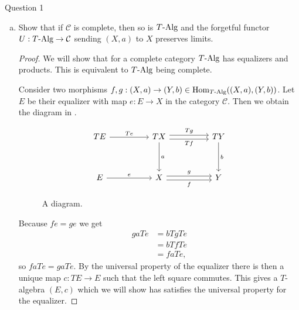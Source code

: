 \documentclass{article}
\DeclareMathOperator{\Id}{Id}
\DeclareMathOperator{\Hom}{Hom}
\newcommand{\cat}{\mathcal{C}}
\newcommand{\alg}[1]{T\textnormal{-Alg}}
\newenvironment{question}[1][]{\begin{paragraph}{Question #1}}{\end{paragraph}}
\theoremstyle{definition}
\begin{document}
\begin{question}[1]
\begin{enumerate}[(a)]
\begin{proof}
                  We know \(fa=\Id\) so \(Taf=T\Id=\Id\). By commutativity of
                  the left square of  this means
                  \(af=\Id\). Therefore \(f\) is a left and right inverse of
                  \(a\) so \(a\) is an isomorphism.
              \end{proof}

        \item Show that if \(\cat\) is complete, then so is \(\alg{T}\) and the
              forgetful functor \(U:\alg{T}\to\cat\) sending \((X,a)\) to \(X\)
              preserves limits.

              \begin{proof}
                  We will show that for a complete category \(\alg{T}\) has
                  equalizers and products. This is equivalent to \(\alg{T}\)
                  being complete.

                  Consider two morphisms \(f,g:(X,a)\to
                  (Y,b)\in\Hom_{\alg{T}}((X,a),(Y,b))\). Let \(E\) be their
                  equalizer with map \(e:E\to X\) in the category \(\cat\).
                  Then we obtain the diagram in .
                  \begin{figure}[H]
                      \[
                          \begin{tikzcd}[ampersand replacement=\&]
                              TE \&\& TX \&\& TY \\
                              \\
                              E \&\& X \&\& Y
                              \arrow["f"', shift right=1, from=3-3, to=3-5]
                              \arrow["g", shift left=1, from=3-3, to=3-5]
                              \arrow["a", from=1-3, to=3-3]
                              \arrow["b", from=1-5, to=3-5]
                              \arrow["Tf"', shift right=1, from=1-3, to=1-5]
                              \arrow["Tg", shift left=1, from=1-3, to=1-5]
                              \arrow["e", from=3-1, to=3-3]
                              \arrow["Te", from=1-1, to=1-3]
                          \end{tikzcd}
                      \]
                      \caption{A diagram.}
                      \label{fig:dia-1}
                  \end{figure}
                  Because \(fe=ge\) we get
                  \begin{align*}
                      gaTe & =bTgTe \\
                           & =bTfTe \\
                           & =faTe,
                  \end{align*}
                  so \(faTe=gaTe\). By the universal property of the equalizer
                  there is then a unique map \(c:TE\to E\) such that the left
                  square commutes. This gives a \(T\)-algebra \((E,c)\) which we
                  will show has satisfies the universal property for the
                  equalizer.


\end{proof}
\end{enumerate}
\end{question}
\end{document}
